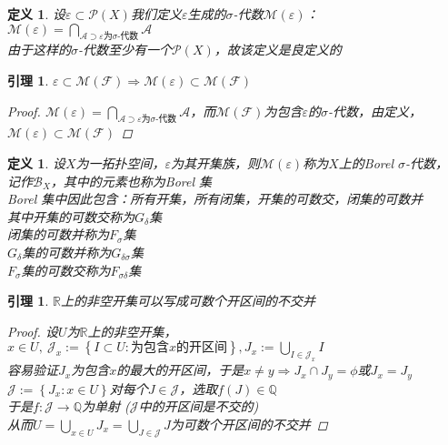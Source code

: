 \documentclass[12pt, a4paper, oneside]{ctexbook}
\newtheorem{definition}[theorem]{定义}
\newtheorem{lemma}[theorem]{引理}
\begin{document}
\begin{definition}
    设$\varepsilon\subset\mathcal{P}(X)$我们定义$\varepsilon$生成的$\sigma$-代数$\mathcal{M}(\varepsilon)$：\\
    $\mathcal{M}(\varepsilon)=\bigcap_{\mathcal{A}\supset\varepsilon\text{为$\sigma$-代数}}\mathcal{A}$\\
    由于这样的$\sigma$-代数至少有一个$\mathcal{P}(X)$，故该定义是良定义的
\end{definition}
\begin{lemma}
    $\varepsilon\subset\mathcal{M}(\mathcal{F})\Rightarrow\mathcal{M}(\varepsilon)\subset\mathcal{M}(\mathcal{F})$
    \begin{proof}
        $\mathcal{M}(\varepsilon)=\bigcap_{\mathcal{A}\supset\varepsilon\text{为$\sigma$-代数}}\mathcal{A}$，而$\mathcal{M}(\mathcal{F})$为包含$\varepsilon$的$\sigma$-代数，由定义，\\
        $\mathcal{M}(\varepsilon)\subset\mathcal{M}(\mathcal{F})$
    \end{proof}
\end{lemma}
\begin{definition}
    设$X$为一拓扑空间，$\varepsilon$为其开集族，则$\mathcal{M}(\varepsilon)$称为$X$上的Borel $\sigma$-代数，
    记作$\mathcal{B}_X$，其中的元素也称为Borel 集\\
    Borel 集中因此包含：所有开集，所有闭集，开集的可数交，闭集的可数并\\
    其中开集的可数交称为$G_{\delta}$集\\
    闭集的可数并称为$F_{\sigma}$集\\
    $G_{\delta}$集的可数并称为$G_{\delta\sigma}$集\\
    $F_{\sigma}$集的可数交称为$F_{\sigma\delta}$集
\end{definition}
\begin{lemma}
    $\mathbb{R}$上的非空开集可以写成可数个开区间的不交并
    \begin{proof}
        设$U$为$\mathbb{R}$上的非空开集，\\
        $x\in U,\ \mathcal{J}_x:=\left\{I\subset U:\text{为包含$x$的开区间}\right\},J_x:=\bigcup_{I\in\mathcal{J}_x}I$\\
        容易验证$J_x$为包含$x$的最大的开区间，于是$x\neq y\Rightarrow J_x\cap J_y=\phi$或$J_x=J_y$\\
        $\mathcal{J}:=\left\{J_x:x\in U\right\}$对每个$J\in\mathcal{J}$，选取$f(J)\in\mathbb{Q}$\\
        于是$f:\mathcal{J}\rightarrow\mathbb{Q}$为单射 ($\mathcal{J}$中的开区间是不交的)\\
        从而$U=\bigcup_{x\in U}J_x=\bigcup_{J\in\mathcal{J}}J$为可数个开区间的不交并
    \end{proof}
\end{lemma}
\end{document}
